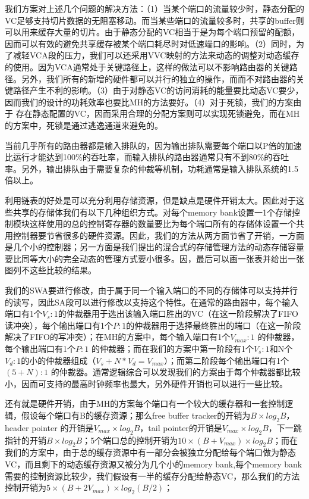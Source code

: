 ﻿\documentclass[10pt,journal]{IEEEtran}
\begin{document}
我们方案对上述几个问题的解决方法：（1）当某个端口的流量较少时，静态分配的VC足够支持切片数据的无阻塞移动。而当某些端口的流量较多时，共享的buffer则可以用来缓存大量的切片。由于静态分配的VC相当于是为每个端口预留的配额，因而可以有效的避免共享缓存被某个端口耗尽时对低速端口的影响。（2）同时，为了减轻VCA段的压力，我们可以还采用VVC映射的方法来动态的调整对动态缓存的使用。因为VCA通常处于关键路径上，这样的做法可以不影响路由器的关键路径。另外，我们所有的新增的硬件都可以并行的独立的操作，而而不对路由器的关键路径产生不利的影响。（3）由于对静态VC的访问消耗的能量要比动态VC要少，因而我们的设计的功耗效率也要比MH的方法要好。（4）对于死锁，我们的方案由于 存在静态配置的VC，因而采用合理的分配方案则可以实现死锁避免，而在MH的方案中，死锁是通过逃逸通道来避免的。

当前几乎所有的路由器都是输入排队的，因为输出排队需要每个端口以P倍的加速比运行才能达到100\%的吞吐率，而输入排队的路由器通常只有不到80\%的吞吐率。另外，输出排队由于需要复杂的仲裁等机制，功耗通常是输入排队系统的1.5倍以上。

利用链表的好处是可以充分利用存储资源，但是缺点是硬件开销太大。因此对于这些共享的存储体我们有以下几种组织方式。对每个memory bank设置一1个存储控制模块这样使用的总的控制寄存器的数量要比为每个端口所有的存储体设置一个共用控制器要节省很多的硬件资源。因此，我们的方法从两方面节省了开销，一方面是几个小的控制器；另一方面是我们提出的混合式的存储管理方法的动态存储容量要比同等大小的完全动态的管理方式要小很多。因，最后可以画一张表并给出一张图列不这些比较的结果。

我们的SWA要进行修改，由于属于同一个输入端口的不同的存储体可以支持并行的读写，因此SA段可以进行修改以支持这个特性。在通常的路由器中，每个输入端口有1个$V_s:1$的仲裁器用于选出该输入端口胜出的VC（在这一阶段解决了FIFO读冲突），每个输出端口有1个$P:1$的仲裁器用于选择最终胜出的端口（在这一阶段解决了FIFO的写冲突）；在MH的方案中，每个输入端口有1个$V_{max}:1$ 的仲裁器，每个输出端口有1个$P:1$ 的仲裁器；而在我们的方案中第一阶段有1个$V_s:1$和N个$V_d:1$的小的仲裁器组成（$V_s+N*V_d=V_{max}$）；而第二阶段每个输出端口有1个$(5+N):1$ 的仲裁器。通常逻辑综合可以发现我们的方案由于每个仲裁器都比较小，因而可支持的最高时钟频率也最大，另外硬件开销也可以进行一些比较。

还有就是硬件开销，由于MH的方案每个端口有一个较大的缓存器和一套控制逻辑，假设每个端口有B的缓存资源；那么free buffer tracker的开销为$B\times log_2 B$，header pointer 的开销是$V_{max}\times log_2 B$，tail pointer的开销是$V_{max}\times log_2 B$，下一跳指针的开销$B\times log_2 B$；5个端口总的控制开销为$10\times(B+V_{max})\times log_2B$；而在我们的方案中，由于总的缓存资源中有一部分会被独立分配给每个端口做为静态VC，而且剩下的动态缓存资源又被分为几个小的memory bank,每个memory bank需要的控制资源比较少，我们假设有一半的缓存分配给静态VC，那么我们的方法控制开销为$5\times(B+2V_{max})\times log_2(B/2)$；
\end{document}
